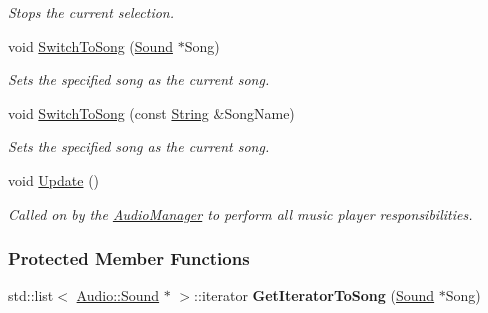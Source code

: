\begin{DoxyCompactItemize}
\begin{DoxyCompactList}\small\item\em Stops the current selection. \item\end{DoxyCompactList}\item 
void \hyperlink{classMezzanine_1_1Audio_1_1MusicPlayer_ab5e7bb1fa75ff93d122e1c934f1038ce}{SwitchToSong} (\hyperlink{classMezzanine_1_1Audio_1_1Sound}{Sound} $\ast$Song)
\begin{DoxyCompactList}\small\item\em Sets the specified song as the current song. \item\end{DoxyCompactList}\item 
void \hyperlink{classMezzanine_1_1Audio_1_1MusicPlayer_ae7addc8338ac8b6bdff03d2742343b2b}{SwitchToSong} (const \hyperlink{namespaceMezzanine_acf9fcc130e6ebf08e3d8491aebcf1c86}{String} \&SongName)
\begin{DoxyCompactList}\small\item\em Sets the specified song as the current song. \item\end{DoxyCompactList}\item 
\hypertarget{classMezzanine_1_1Audio_1_1MusicPlayer_ae03bceb937bf8d30ada98d5b56b189e9}{
void \hyperlink{classMezzanine_1_1Audio_1_1MusicPlayer_ae03bceb937bf8d30ada98d5b56b189e9}{Update} ()}
\label{classMezzanine_1_1Audio_1_1MusicPlayer_ae03bceb937bf8d30ada98d5b56b189e9}

\begin{DoxyCompactList}\small\item\em Called on by the \hyperlink{classMezzanine_1_1AudioManager}{AudioManager} to perform all music player responsibilities. \item\end{DoxyCompactList}\end{DoxyCompactItemize}
\subsubsection*{Protected Member Functions}
\begin{DoxyCompactItemize}
\item 
\hypertarget{classMezzanine_1_1Audio_1_1MusicPlayer_a1ea1c375b6a3bac8ef225bd62558dcbb}{
std::list$<$ \hyperlink{classMezzanine_1_1Audio_1_1Sound}{Audio::Sound} $\ast$ $>$::iterator {\bfseries GetIteratorToSong} (\hyperlink{classMezzanine_1_1Audio_1_1Sound}{Sound} $\ast$Song)}
\label{classMezzanine_1_1Audio_1_1MusicPlayer_a1ea1c375b6a3bac8ef225bd62558dcbb}

\end{DoxyCompactItemize}
